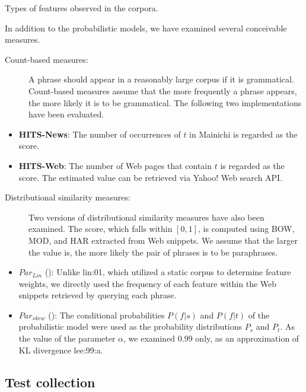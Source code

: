 \documentclass[english]{jnlp_1.4}
\renewcommand{\cite}{}
\newcommand{\newcite}{}
\begin{document}
\begin{table}[t]
\caption{Types of features observed in the corpora.}
\label{tab:feature}

\end{table}

In addition to the probabilistic models, we have examined several
conceivable measures.
\begin{description}
\item[Count-based measures:] A phrase should appear in a reasonably
  large corpus if it is grammatical.  Count-based measures assume that
  the more frequently a phrase appears, the more likely it is to be
  grammatical.  The following two implementations have been evaluated.
\end{description}
\begin{itemize}
\item \textbf{HITS-News}: The number of occurrences of $t$ in Mainichi
  is regarded as the score.
\item \textbf{HITS-Web}: The number of Web pages that contain $t$ is
  regarded as the score.  The estimated value can be retrieved via
  Yahoo! Web search API.
\end{itemize}
\begin{description}
\item[Distributional similarity measures:] Two versions of
  distributional similarity measures have also been examined.  The
  score, which falls within $[0,1]$, is computed using BOW, MOD, and
  HAR extracted from Web snippets.  We assume that the larger the
  value is, the more likely the pair of phrases is to be paraphrases.
\end{description}
\begin{itemize}
\item $\mathit{Par_{Lin}}$ (): Unlike \newcite{lin:01}, which
  utilized a static corpus to determine feature weights, we directly
  used the frequency of each feature within the Web snippets retrieved
  by querying each phrase.
\item $\mathit{Par_{skew}}$ (): The conditional probabilities
  $P(f|s)$ and $P(f|t)$ of the probabilistic model were used as the
  probability distributions $P_{s}$ and $P_{t}$.  As the value of the
  parameter $\alpha$, we examined 0.99 only, as an approximation of KL
  divergence \cite{lee:99:a}.
\end{itemize}

\subsection{Test collection}
\label{ssec:collection}
\end{document}
